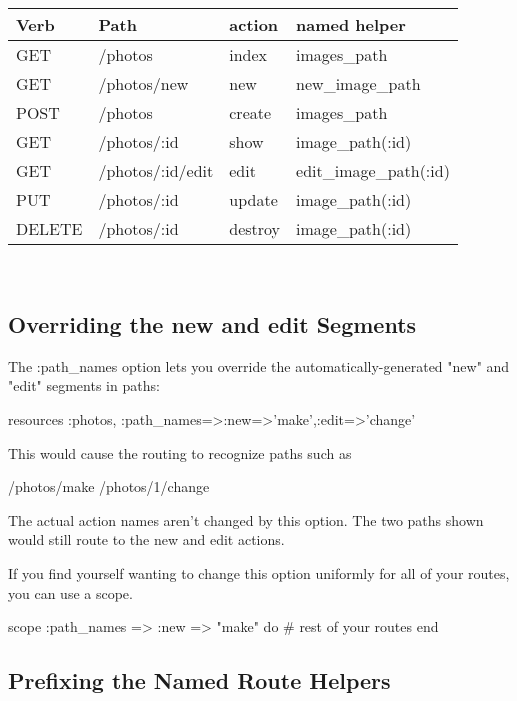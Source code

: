 \documentclass[10pt]{book}
\newenvironment{code}{%
  \scriptsize
    \verbatim
}{%
    \endverbatim
    \newline
}
\begin{document}
\noindent
\begin{tabular}{l|p{}|l|p{}}
\hline
\textbf{Verb} & \textbf{Path            } & \textbf{action } & \textbf{named helper        } \\ 
\hline
GET & /photos            & index     &  images\_path           \\ 
GET & /photos/new        & new       &  new\_image\_path        \\ 
POST & /photos            & create    &  images\_path           \\ 
GET & /photos/:id        & show      &  image\_path(:id)       \\ 
GET & /photos/:id/edit   & edit      &  edit\_image\_path(:id)  \\ 
PUT & /photos/:id        & update    &  image\_path(:id)       \\ 
DELETE & /photos/:id        & destroy   &  image\_path(:id)      
\end{tabular}\\


\subsection{ Overriding the new and edit Segments}

The :path\_names option lets you override the automatically-generated "new" and "edit" segments in paths:
\begin{code}
resources :photos, :path_names=>{:new=>'make',:edit=>'change'}
\end{code}

This would cause the routing to recognize paths such as
\begin{code}
/photos/make
/photos/1/change
\end{code}

The actual action names aren’t changed by this option. The two paths shown would still route to the new and edit actions.

If you find yourself wanting to change this option uniformly for all of your routes, you can use a scope.
\begin{code}
scope :path_names => { :new => "make" } do
  # rest of your routes
end
\end{code}

\subsection{ Prefixing the Named Route Helpers}
\end{document}
